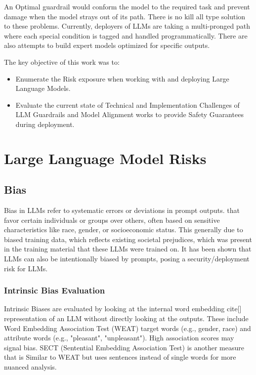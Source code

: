\documentclass[11pt]{article}
\begin{document}
An Optimal guardrail would conform the model to the required task and prevent damage when the model strays out of its path. There is no kill all type solution to these problems. Currently, deployers of LLMs are taking a multi-pronged path where each special condition is tagged and handled programmatically. There are also attempts to build expert models optimized for specific outputs.

The key objective of this work was to:
\begin{itemize}
    \itemsep0em
    \item Enumerate the Risk exposure when working with and deploying Large Language Models.
    \item Evaluate the current state of Technical and Implementation Challenges of LLM Guardrails and Model Alignment works to provide Safety Guarantees during deployment.
\end{itemize}


\section{ Large Language Model Risks}

\subsection{Bias}

Bias in LLMs \cite{yeh2023evaluating} \cite{von2023assessing} refer to systematic errors or deviations in prompt outputs. that favor certain individuals or groups over others, often based on sensitive characteristics like race, gender, or socioeconomic status. This generally due to biased training data, which reflects existing societal prejudices, which was present in the training material that these LLMs were trained on.
It has been shown that LLMs can also be intentionally biased by prompts, posing a security/deployment risk for LLMs. \cite{badyal2023intentional}


\subsubsection{Intrinsic Bias Evaluation}
Intrinsic Biases are evaluated by looking at the internal word embedding cite[] representation of an LLM without directly looking at the outputs.
These include Word Embedding Association Test (WEAT) \cite{li2021self} target words (e.g., gender, race) and attribute words (e.g., "pleasant", "unpleasant"). High association scores may signal bias.
SECT (Sentential Embedding Association Test) \cite{prior2008word} is another measure that is Similar to WEAT but uses sentences instead of single words for more nuanced analysis.
\end{document}
